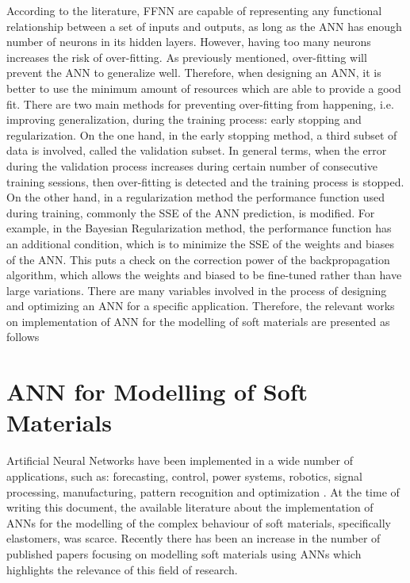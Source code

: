 According to the literature, FFNN are capable of representing any functional relationship between a set of inputs and outputs, as long as the ANN has enough number of neurons in its hidden layers. However, having too many neurons increases the risk of over-fitting. As previously mentioned, over-fitting will prevent the ANN to generalize well. Therefore, when designing an ANN, it is better to use the minimum amount of resources which are able to provide a good fit. There are two main methods for preventing over-fitting from happening, i.e. improving generalization, during the training process: early stopping and regularization. On the one hand, in the early stopping method, a third subset of data is involved, called the validation subset. In general terms, when the error during the validation process increases during certain number of consecutive training sessions, then over-fitting is detected and the training process is stopped. On the other hand, in a regularization method the performance function used during training, commonly the SSE of the ANN prediction, is modified. For example, in the Bayesian Regularization method, the performance function has an additional condition, which is to minimize the SSE of the weights and biases of the ANN. This puts a check on the correction power of the backpropagation algorithm, which allows the weights and biased to be fine-tuned rather than have large variations. There are many variables involved in the process of designing and optimizing an ANN for a specific application. Therefore, the relevant works on implementation of ANN for the modelling of soft materials are presented as follows

\section{ANN for Modelling of Soft Materials }

Artificial Neural Networks have been implemented in a wide number of applications, such as: forecasting, control, power systems, robotics, signal processing, manufacturing, pattern recognition and optimization \cite{khan2019fabrication}. At the time of writing this document, the available literature about the implementation of ANNs for the modelling of the complex behaviour of soft materials, specifically elastomers, was scarce. Recently there has been an increase in the number of published papers focusing on modelling soft materials using ANNs which highlights the relevance of this field of research.

